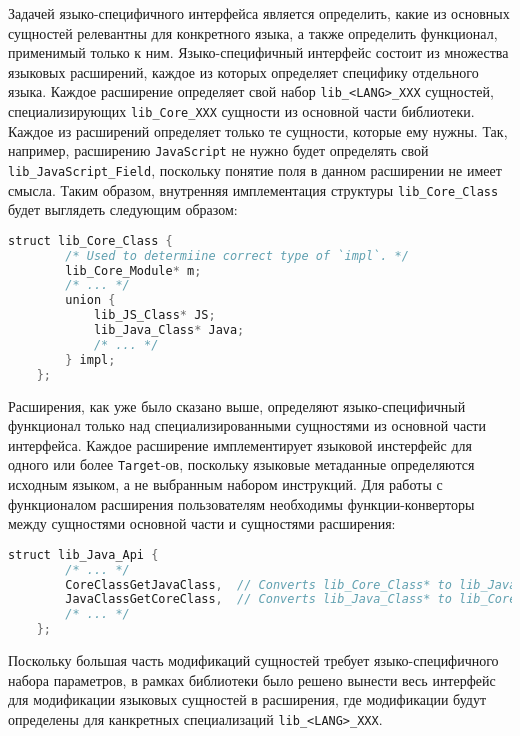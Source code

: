 Задачей языко-специфичного интерфейса является определить, какие из основных сущностей релевантны для конкретного языка, а также определить функционал, применимый только к ним. Языко-специфичный интерфейс состоит из множества языковых расширений, каждое из которых определяет специфику отдельного языка. Каждое расширение определяет свой набор \texttt{lib\_<LANG>\_XXX} сущностей, специализирующих \texttt{lib\_Core\_XXX} сущности из основной части библиотеки. Каждое из расширений определяет только те сущности, которые ему нужны. Так, например, расширению \texttt{JavaScript} не нужно будет определять свой \texttt{lib\_JavaScript\_Field}, поскольку понятие поля в данном расширении не имеет смысла. Таким образом, внутренняя имплементация структуры \texttt{lib\_Core\_Class} будет выглядеть следующим образом:

\begin{lstlisting}[language=Java, caption=Внутренняя имплементация типа \texttt{lib\_Core\_Class}, label=lst:libClass]
    struct lib_Core_Class {
        /* Used to determiine correct type of `impl`. */
        lib_Core_Module* m;
        /* ... */
        union {
            lib_JS_Class* JS;
            lib_Java_Class* Java;
            /* ... */
        } impl;
    };
\end{lstlisting}

Расширения, как уже было сказано выше, определяют языко-специфичный функционал только над специализированными сущностями из основной части интерфейса. Каждое расширение имплементирует языковой инстерфейс для одного или более \texttt{Target}-ов, поскольку языковые метаданные определяются исходным языком, а не выбранным набором инструкций. Для работы с функционалом расширения пользователям необходимы функции-конверторы между сущностями основной части и сущностями расширения:

\begin{lstlisting}[language=Java, caption=Пример функций-конверторов., label=lst:libConvertors]
    struct lib_Java_Api {
        /* ... */
        CoreClassGetJavaClass,  // Converts lib_Core_Class* to lib_Java_Class*
        JavaClassGetCoreClass,  // Converts lib_Java_Class* to lib_Core_Class*
        /* ... */
    };
\end{lstlisting}

Поскольку большая часть модификаций сущностей требует языко-специфичного набора параметров, в рамках библиотеки было решено вынести весь интерфейс для модификации языковых сущностей в расширения, где модификации будут определены для канкретных специализаций \texttt{lib\_<LANG>\_XXX}.

